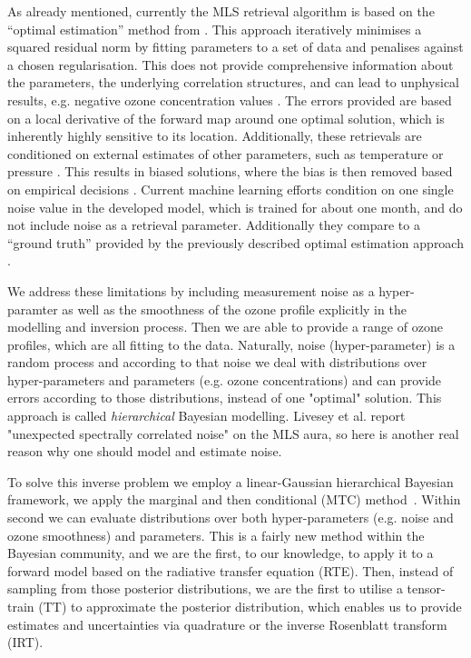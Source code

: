 As already mentioned, currently the MLS retrieval algorithm \cite{livesey2006retrieval} is based on the ``optimal estimation'' method from \cite{rodgers1976retrieval}.
This approach iteratively minimises a squared residual norm by fitting parameters to a set of data and penalises against a chosen regularisation.
This does not provide comprehensive information about the parameters, the underlying correlation structures, and can lead to unphysical results, e.g. negative ozone concentration values \cite{MLSdata}.
The errors provided are based on a local derivative of the forward map around one optimal solution, which is inherently highly sensitive to its location.
Additionally, these retrievals are conditioned on external estimates of other parameters, such as temperature or pressure \cite{livesey2006retrieval}.
This results in biased solutions, where the bias is then removed based on empirical decisions \cite{livesey2008ozonecarbonmono, Froidevaux2008snrozone}.
Current machine learning efforts condition on one single noise value in the developed model, which is trained for about one month, and do not include noise as a retrieval parameter.
Additionally they compare to a ``ground truth'' provided by the previously described optimal estimation approach \cite{werner2023machlearn, bojkov2008NeuralNet}.

We address these limitations by including measurement noise as a hyper-paramter as well as the smoothness of the ozone profile explicitly in the modelling and inversion process.
Then we are able to provide a range of ozone profiles, which are all fitting to the data.
Naturally, noise (hyper-parameter) is a random process and according to that noise we deal with distributions over hyper-parameters and parameters (e.g. ozone concentrations) and can provide errors according to those distributions, instead of one "optimal" solution.
This approach is called \textit{hierarchical} Bayesian modelling.
Livesey et al. \cite{livesey2006retrieval} report "unexpected spectrally correlated noise" on the MLS aura, so here is another real reason why one should model and estimate noise.

To solve this inverse problem we employ a linear-Gaussian hierarchical Bayesian framework, we apply the marginal and then conditional (MTC) method~\cite{fox2016fast}.
Within second we can evaluate distributions over both hyper-parameters (e.g. noise and ozone smoothness) and parameters.
This is a fairly new method within the Bayesian community, and we are the first, to our knowledge, to apply it to a forward model based on the radiative transfer equation (RTE).
Then, instead of sampling from those posterior distributions, we are the first to utilise a tensor-train (TT) to approximate the posterior distribution, which enables us to provide estimates and uncertainties via quadrature or the inverse Rosenblatt transform (IRT).

